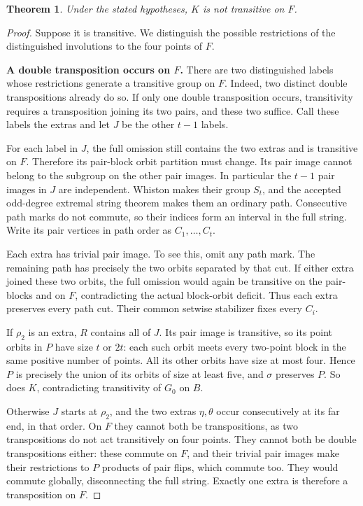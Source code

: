 \documentclass[11pt,a4paper]{article}
\newtheorem{theorem}[lemma]{Theorem}
\begin{document}
\begin{theorem}\label{main}
Under the stated hypotheses, $K$ is not transitive on $F$.
\end{theorem}
\begin{proof}
Suppose it is transitive. We distinguish the possible restrictions of
the distinguished involutions to the four points of $F$.

\medskip\noindent\textbf{A double transposition occurs on $F$.}
There are two distinguished labels whose restrictions generate a
transitive group on $F$. Indeed, two distinct double transpositions
already do so. If only one double transposition occurs, transitivity
requires a transposition joining its two pairs, and these two suffice.
Call these labels the extras and let $J$ be the other $t-1$ labels.

For each label in $J$, the full omission still contains the two extras
and is transitive on $F$. Therefore its pair-block orbit partition must
change. Its pair image cannot belong to the subgroup on the other pair
images. In particular the $t-1$ pair images in $J$ are independent.
Whiston makes their group $S_t$, and the accepted odd-degree extremal
string theorem makes them an ordinary path. Consecutive path marks
do not commute, so their indices form an interval in the full string.
Write its pair vertices in path order as $C_1,\ldots,C_t$.

Each extra has trivial pair image. To see this, omit any path mark.
The remaining path has precisely the two orbits separated by that cut.
If either extra joined these two orbits, the full omission would again
be transitive on the pair-blocks and on $F$, contradicting the actual
block-orbit deficit. Thus each extra preserves every path cut.
Their common setwise stabilizer fixes every $C_i$.

If $\rho_2$ is an extra, $R$ contains all of $J$. Its pair image is
transitive, so its point orbits in $P$ have size $t$ or $2t$: each such
orbit meets every two-point block in the same positive number of points.
All its other orbits have size at most four. Hence $P$ is precisely
the union of its orbits of size at least five, and $\sigma$ preserves $P$.
So does $K$, contradicting transitivity of $G_0$ on $B$.

Otherwise $J$ starts at $\rho_2$, and the two extras $\eta,\theta$ occur
consecutively at its far end, in that order. On $F$ they cannot both be
transpositions, as two transpositions do not act transitively on four
points. They cannot both be double transpositions either: these commute
on $F$, and their trivial pair images make their restrictions to $P$
products of pair flips, which commute too. They would commute globally,
disconnecting the full string. Exactly one extra is therefore a
transposition on $F$.


\end{proof}
\end{document}
